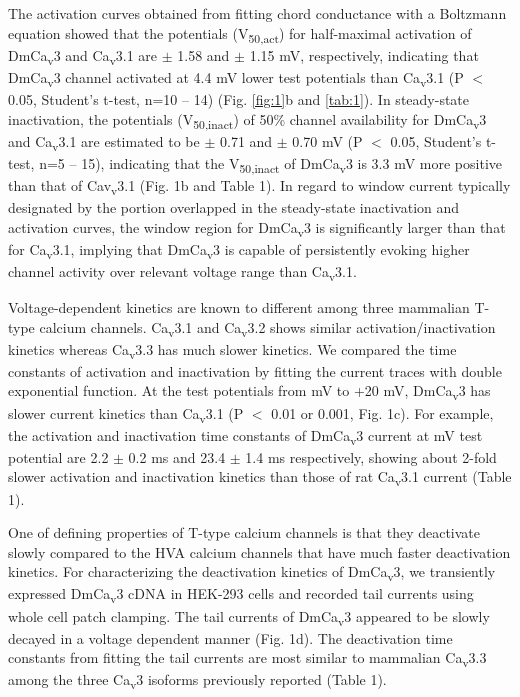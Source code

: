 The activation curves obtained from fitting chord conductance with a Boltzmann equation showed that the potentials (V\textsubscript{50,act}) for half-maximal activation of DmCa\textsubscript{v}3 and Ca\textsubscript{v}3.1 are  $\pm$ 1.58 and  $\pm$ 1.15 mV, respectively, indicating that DmCa\textsubscript{v}3 channel activated at 4.4 mV lower test potentials than Ca\textsubscript{v}3.1 (P $<$ 0.05, Student's t-test, n=10 -- 14) (Fig. \ref{fig:1}b and \ref{tab:1}).
In steady-state inactivation, the potentials (V\textsubscript{50,inact}) of 50\% channel availability for DmCa\textsubscript{v}3 and Ca\textsubscript{v}3.1 are estimated to be  $\pm$ 0.71 and  $\pm$ 0.70 mV (P $<$ 0.05, Student's t-test, n=5 -- 15), indicating that the V\textsubscript{50,inact} of DmCa\textsubscript{v}3 is 3.3 mV more positive than that of Cav\textsubscript{v}3.1 (Fig. 1b and Table 1).
In regard to window current typically designated by the portion overlapped in the steady-state inactivation and activation curves, the window region for DmCa\textsubscript{v}3 is significantly larger than that for Ca\textsubscript{v}3.1, implying that DmCa\textsubscript{v}3 is capable of persistently evoking higher channel activity over relevant voltage range than Ca\textsubscript{v}3.1.

Voltage-dependent kinetics are known to different among three mammalian T-type calcium channels\cite{10594642}.
Ca\textsubscript{v}3.1 and Ca\textsubscript{v}3.2 shows similar activation/inactivation kinetics whereas Ca\textsubscript{v}3.3 has much slower kinetics.
We compared the time constants of activation and inactivation by fitting the current traces with double exponential function.
At the test potentials from  mV to +20 mV,  DmCa\textsubscript{v}3 has slower current kinetics than Ca\textsubscript{v}3.1 (P $<$ 0.01 or 0.001, Fig. 1c).
For example, the activation and inactivation time constants of DmCa\textsubscript{v}3 current at  mV test potential are 2.2 $\pm$ 0.2 ms and 23.4 $\pm$ 1.4 ms respectively, showing about 2-fold slower activation and inactivation kinetics than those of rat Ca\textsubscript{v}3.1 current (Table 1).

One of defining properties of T-type calcium channels is that they deactivate slowly compared to the HVA calcium channels that have much faster deactivation kinetics\cite{9495342, 10066244, 2419479}. 
For characterizing the deactivation kinetics of DmCa\textsubscript{v}3, we transiently expressed DmCa\textsubscript{v}3 cDNA in HEK-293 cells and recorded tail currents using whole cell patch clamping. 
The tail currents of DmCa\textsubscript{v}3 appeared to be slowly decayed in a voltage dependent manner (Fig. 1d). 
The deactivation time constants from fitting the tail currents are most similar to mammalian Ca\textsubscript{v}3.3 among the three Ca\textsubscript{v}3 isoforms previously reported (Table 1). 

